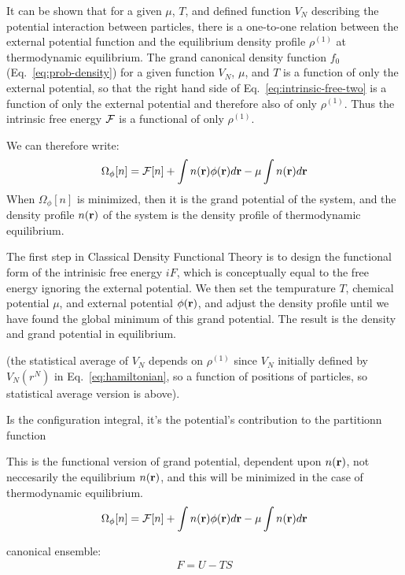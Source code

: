 It can be shown that for a given $\mu$, $T$, and defined function
$V_N$ describing the potential interaction between particles, there is
a one-to-one relation between the external potential function and the
equilibrium density profile $\rho^{(1)}$ at thermodynamic equilibrium.
The grand canonical density function $f_0$ (Eq.~\ref{eq:prob-density})
for a given function $V_N$, $\mu$, and $T$ is a function of only the
external potential, so that the right hand side of
Eq.~\ref{eq:intrinsic-free-two} is a function of only the external
potential and therefore also of only $\rho^{(1)}$.  Thus the intrinsic
free energy $\mathcal{F}$ is a functional of only $\rho^{(1)}$.

We can therefore write:
\begin{align}
  \Omega_{\phi}[n] = \mathcal{F}[n] + \int n(\textbf{r})\phi(\textbf{r})d\textbf{r} - \mu\int n(\textbf{r})d\textbf{r}
\end{align}
When $\Omega_{\phi}[n]$ is minimized, then it is the grand potential
of the system, and the density profile $n(\textbf{r})$ of the system is the
density profile of thermodynamic equilibrium.

The first step in Classical Density Functional Theory is to design the
functional form of the intrinisic free energy $iF$, which is
conceptually equal to the free energy ignoring the external potential.
We then set the tempurature $T$, chemical potential $\mu$, and
external potential $\phi(\textbf{r})$, and adjust the density profile until
we have found the global minimum of this grand potential.  The result
is the density and grand potential in equilibrium.


(the statistical average of $V_N$
depends on $\rho^{(1)}$ since $V_N$ initially defined by $V_N(r^N)$ in
Eq.~\ref{eq:hamiltonian}, so a function of positions of particles, so
statistical average version is above).

Is the configuration integral, it's the potential's contribution to the partitionn function

This is the functional version of grand potential, dependent upon
$n(\textbf{r})$, not neccesarily the equilibrium $n(\textbf{r})$, and this will be
minimized in the case of thermodynamic equilibrium.
\begin{align}
  \Omega_{\phi}[n] = \mathcal{F}[n] + \int n(\textbf{r})\phi(\textbf{r})d\textbf{r} - \mu\int n(\textbf{r})d\textbf{r}
\end{align}



canonical ensemble:
\begin{align}
  F = U - TS
\end{align}


